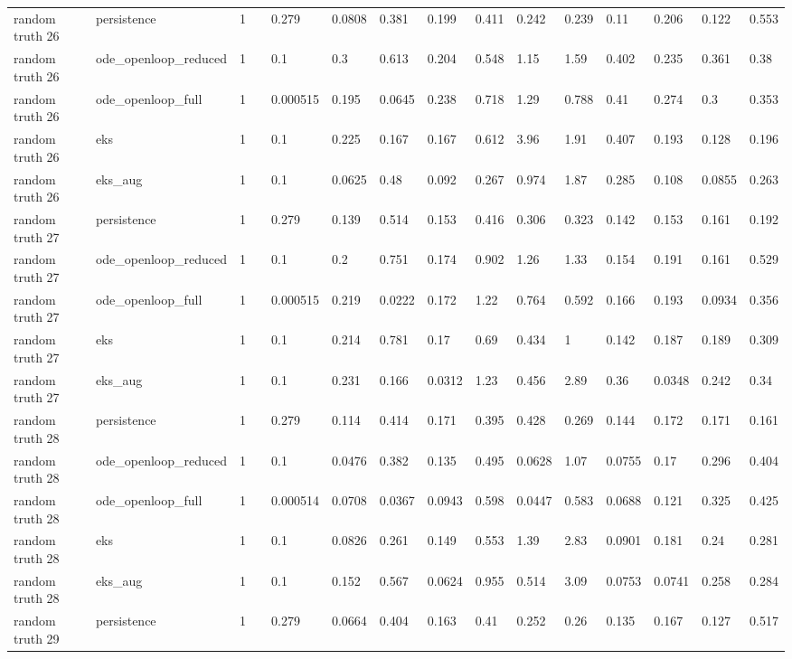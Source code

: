 \begin{table}[t]
\begin{tabular}{lllllllllllllll}
random truth 26 & persistence & 1 &  & 0.279 & 0.0808 & 0.381 & 0.199 & 0.411 & 0.242 & 0.239 & 0.11 & 0.206 & 0.122 & 0.553 \\
random truth 26 & ode\_openloop\_reduced & 1 &  & 0.1 & 0.3 & 0.613 & 0.204 & 0.548 & 1.15 & 1.59 & 0.402 & 0.235 & 0.361 & 0.38 \\
random truth 26 & ode\_openloop\_full & 1 &  & 0.000515 & 0.195 & 0.0645 & 0.238 & 0.718 & 1.29 & 0.788 & 0.41 & 0.274 & 0.3 & 0.353 \\
random truth 26 & eks & 1 &  & 0.1 & 0.225 & 0.167 & 0.167 & 0.612 & 3.96 & 1.91 & 0.407 & 0.193 & 0.128 & 0.196 \\
random truth 26 & eks\_aug & 1 &  & 0.1 & 0.0625 & 0.48 & 0.092 & 0.267 & 0.974 & 1.87 & 0.285 & 0.108 & 0.0855 & 0.263 \\
random truth 27 & persistence & 1 &  & 0.279 & 0.139 & 0.514 & 0.153 & 0.416 & 0.306 & 0.323 & 0.142 & 0.153 & 0.161 & 0.192 \\
random truth 27 & ode\_openloop\_reduced & 1 &  & 0.1 & 0.2 & 0.751 & 0.174 & 0.902 & 1.26 & 1.33 & 0.154 & 0.191 & 0.161 & 0.529 \\
random truth 27 & ode\_openloop\_full & 1 &  & 0.000515 & 0.219 & 0.0222 & 0.172 & 1.22 & 0.764 & 0.592 & 0.166 & 0.193 & 0.0934 & 0.356 \\
random truth 27 & eks & 1 &  & 0.1 & 0.214 & 0.781 & 0.17 & 0.69 & 0.434 & 1 & 0.142 & 0.187 & 0.189 & 0.309 \\
random truth 27 & eks\_aug & 1 &  & 0.1 & 0.231 & 0.166 & 0.0312 & 1.23 & 0.456 & 2.89 & 0.36 & 0.0348 & 0.242 & 0.34 \\
random truth 28 & persistence & 1 &  & 0.279 & 0.114 & 0.414 & 0.171 & 0.395 & 0.428 & 0.269 & 0.144 & 0.172 & 0.171 & 0.161 \\
random truth 28 & ode\_openloop\_reduced & 1 &  & 0.1 & 0.0476 & 0.382 & 0.135 & 0.495 & 0.0628 & 1.07 & 0.0755 & 0.17 & 0.296 & 0.404 \\
random truth 28 & ode\_openloop\_full & 1 &  & 0.000514 & 0.0708 & 0.0367 & 0.0943 & 0.598 & 0.0447 & 0.583 & 0.0688 & 0.121 & 0.325 & 0.425 \\
random truth 28 & eks & 1 &  & 0.1 & 0.0826 & 0.261 & 0.149 & 0.553 & 1.39 & 2.83 & 0.0901 & 0.181 & 0.24 & 0.281 \\
random truth 28 & eks\_aug & 1 &  & 0.1 & 0.152 & 0.567 & 0.0624 & 0.955 & 0.514 & 3.09 & 0.0753 & 0.0741 & 0.258 & 0.284 \\
random truth 29 & persistence & 1 &  & 0.279 & 0.0664 & 0.404 & 0.163 & 0.41 & 0.252 & 0.26 & 0.135 & 0.167 & 0.127 & 0.517 \\

\end{tabular}
\end{table}
